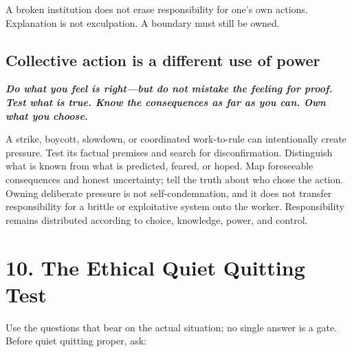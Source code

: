 \documentclass[11pt,oneside]{article}
\renewenvironment{quote}
  {\begin{tcolorbox}[
      enhanced,
      breakable,
      colback=ManifestLight,
      colframe=ManifestRule,
      boxrule=0pt,
      leftrule=3pt,
      arc=0pt,
      outer arc=0pt,
      left=10pt,right=10pt,top=8pt,bottom=8pt,
      before skip=0.8em,after skip=0.8em
    ]\itshape}
  {\end{tcolorbox}}
\begin{document}
A broken institution does not erase responsibility for one's own
actions. Explanation is not exculpation. A boundary must still be owned.

\hypertarget{collective-action-is-a-different-use-of-power}{%
\subsection{Collective action is a different use of
power}\label{collective-action-is-a-different-use-of-power}}

\begin{quote}
\textbf{Do what you feel is right---but do not mistake the feeling for
proof. Test what is true. Know the consequences as far as you can. Own
what you choose.}
\end{quote}

A strike, boycott, slowdown, or coordinated work-to-rule can
intentionally create pressure. Test its factual premises and search for
disconfirmation. Distinguish what is known from what is predicted,
feared, or hoped. Map foreseeable consequences and honest uncertainty;
tell the truth about who chose the action. Owning deliberate pressure is
not self-condemnation, and it does not transfer responsibility for a
brittle or exploitative system onto the worker. Responsibility remains
distributed according to choice, knowledge, power, and control.

\hypertarget{the-ethical-quiet-quitting-test}{%
\section{10. The Ethical Quiet Quitting
Test}\label{the-ethical-quiet-quitting-test}}

Use the questions that bear on the actual situation; no single answer is
a gate. Before quiet quitting proper, ask:
\end{document}
